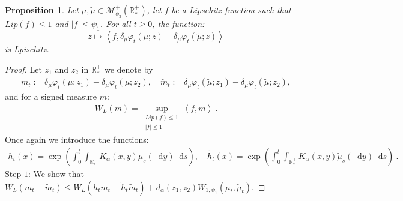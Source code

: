 \documentclass[11pt,a4paper]{article}
\newcommand{\RRP}{\mathbb{R}^+_*}
\newcommand{\MC}{\mathcal{M}}
\newcommand{\brac}[1]{\left\langle#1\right\rangle}
\newcommand{\dd}{\mathop{}\!\mathrm{d}}
\newtheorem{proposition}[theorem]{Proposition}
\begin{document}
\begin{proposition}
    Let $\mu,\tilde{\mu} \in \MC_{\phi_3}^+(\RRP)$, let $f$ be a Lipschitz function such that $Lip(f) \leq 1$ and $|f| \leq \psi_1$. For all $t \geq 0$, the function:
    \[
    z \mapsto \brac{f,\delta_\mu \varphi_t(\mu;z) - \delta_\mu \varphi_t(\tilde{\mu};z)}
    \]
    is Lpischitz.
\end{proposition}
\begin{proof}
    Let $z_1$ and $z_2$ in $\RRP$ we denote by 
    \begin{align*}
        m_t := \delta_\mu \varphi_t(\mu;z_1) - \delta_\mu \varphi_t(\mu;z_2), \quad \tilde{m}_t := \delta_\mu \varphi_t(\tilde{\mu};z_1) - \delta_\mu \varphi_t(\tilde{\mu};z_2),
    \end{align*}
    and for a signed measure $m$:
    \begin{align*}
        W_L(m) = \sup\limits_{\substack{Lip(f) \leq 1 \\ |f| \leq 1}} \brac{f,m}\ .
    \end{align*}
    Once again we introduce the functions:
    \begin{align*}
        h_t(x) = \exp\left(\int_0^t \int_{\RRP} K_\alpha(x,y) \mu_s(\dd y)\dd s \right), \quad \tilde{h}_t(x) = \exp\left(\int_0^t \int_{\RRP} K_\alpha(x,y) \tilde{\mu}_s(\dd y)\dd s \right)\ .
    \end{align*}
    Step $1$: We show that $W_L(m_t - \tilde{m}_t) \leq W_L(h_tm_t - \tilde{h}_t\tilde{m}_t) + d_\alpha(z_1,z_2)W_{1,\psi_1}(\mu_t,\tilde{\mu}_t)$.


\end{proof}
\end{document}
